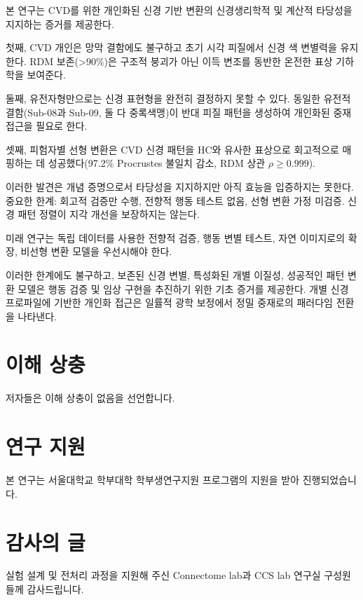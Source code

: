 \documentclass[12pt,a4paper]{article}
\begin{document}
본 연구는 CVD를 위한 개인화된 신경 기반 변환의 신경생리학적 및 계산적 타당성을 지지하는 증거를 제공한다.

첫째, CVD 개인은 망막 결함에도 불구하고 초기 시각 피질에서 신경 색 변별력을 유지한다. RDM 보존(>90\%)은 구조적 붕괴가 아닌 이득 변조를 동반한 온전한 표상 기하학을 보여준다.

둘째, 유전자형만으로는 신경 표현형을 완전히 결정하지 못할 수 있다. 동일한 유전적 결함(Sub-08과 Sub-09, 둘 다 중록색맹)이 반대 피질 패턴을 생성하여 개인화된 중재 접근을 필요로 한다.

셋째, 피험자별 선형 변환은 CVD 신경 패턴을 HC와 유사한 표상으로 회고적으로 매핑하는 데 성공했다(97.2\% Procrustes 불일치 감소, RDM 상관 $\rho \geq 0.999$).

이러한 발견은 개념 증명으로서 타당성을 지지하지만 아직 효능을 입증하지는 못한다. 중요한 한계: 회고적 검증만 수행, 전향적 행동 테스트 없음, 선형 변환 가정 미검증. 신경 패턴 정렬이 지각 개선을 보장하지는 않는다.

미래 연구는 독립 데이터를 사용한 전향적 검증, 행동 변별 테스트, 자연 이미지로의 확장, 비선형 변환 모델을 우선시해야 한다.

이러한 한계에도 불구하고, 보존된 신경 변별, 특성화된 개별 이질성, 성공적인 패턴 변환 모델은 행동 검증 및 임상 구현을 추진하기 위한 기초 증거를 제공한다. 개별 신경 프로파일에 기반한 개인화 접근은 일률적 광학 보정에서 정밀 중재로의 패러다임 전환을 나타낸다.


\section*{이해 상충}
저자들은 이해 상충이 없음을 선언합니다.

\section*{연구 지원}
본 연구는 서울대학교 학부대학 학부생연구지원 프로그램의 지원을 받아 진행되었습니다.

\section*{감사의 글}
실험 설계 및 전처리 과정을 지원해 주신 Connectome lab과 CCS lab 연구실 구성원들께 감사드립니다.


\printbibliography
\end{document}
